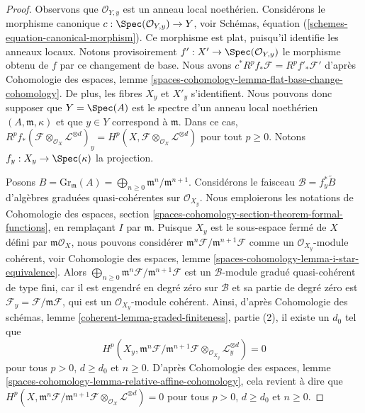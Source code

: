 \begin{proof}
Observons que $\mathcal{O}_{Y, y}$ est un anneau local noethérien.
Considérons le morphisme canonique
$c : \Spec(\mathcal{O}_{Y, y}) \to Y$, voir
Schémas, équation (\ref{schemes-equation-canonical-morphism}).
Ce morphisme est plat, puisqu'il identifie les anneaux locaux.
Notons provisoirement $f' : X' \to \Spec(\mathcal{O}_{Y, y})$
le morphisme obtenu de $f$ par ce changement de base. Nous avons
$c^*R^pf_*\mathcal{F} = R^pf'_*\mathcal{F}'$ d'après
Cohomologie des espaces, lemme
\ref{spaces-cohomology-lemma-flat-base-change-cohomology}.
De plus, les fibres $X_y$ et $X'_y$ s'identifient.
Nous pouvons donc supposer que $Y = \Spec(A)$ est le spectre d'un
anneau local noethérien $(A, \mathfrak m, \kappa)$ et que $y \in Y$
correspond à $\mathfrak m$. Dans ce cas,
$R^pf_*(\mathcal{F} \otimes_{\mathcal{O}_X} \mathcal{L}^{\otimes d})_y =
H^p(X, \mathcal{F} \otimes_{\mathcal{O}_X} \mathcal{L}^{\otimes d})$
pour tout $p \geq 0$. Notons $f_y : X_y \to \Spec(\kappa)$ la projection.

\medskip\noindent
Posons $B = \text{Gr}_\mathfrak m(A) =
\bigoplus_{n \geq 0} \mathfrak m^n/\mathfrak m^{n + 1}$.
Considérons le faisceau $\mathcal{B} = f_y^*\widetilde{B}$
d'algèbres graduées quasi-cohérentes sur $\mathcal{O}_{X_y}$.
Nous emploierons les notations de Cohomologie des espaces, section
\ref{spaces-cohomology-section-theorem-formal-functions},
en remplaçant $I$ par $\mathfrak m$.
Puisque $X_y$ est le sous-espace fermé de $X$ défini par
$\mathfrak m\mathcal{O}_X$, nous pouvons considérer
$\mathfrak m^n\mathcal{F}/\mathfrak m^{n + 1}\mathcal{F}$
comme un $\mathcal{O}_{X_y}$-module cohérent, voir
Cohomologie des espaces, lemme \ref{spaces-cohomology-lemma-i-star-equivalence}.
Alors
$\bigoplus_{n \geq 0} \mathfrak m^n\mathcal{F}/\mathfrak m^{n + 1}\mathcal{F}$
est un $\mathcal{B}$-module gradué quasi-cohérent de type fini,
car il est engendré en degré zéro sur $\mathcal{B}$
et sa partie de degré zéro est
$\mathcal{F}_y = \mathcal{F}/\mathfrak m \mathcal{F}$,
qui est un $\mathcal{O}_{X_y}$-module cohérent.
Ainsi, d'après Cohomologie des schémas, lemme
\ref{coherent-lemma-graded-finiteness}, partie (2),
il existe un $d_0$ tel que
$$
H^p(X_y, \mathfrak m^n \mathcal{F}/ \mathfrak m^{n + 1}\mathcal{F}
\otimes_{\mathcal{O}_{X_y}} \mathcal{L}_y^{\otimes d}) = 0
$$
pour tous $p > 0$, $d \geq d_0$ et $n \geq 0$. D'après
Cohomologie des espaces, lemme
\ref{spaces-cohomology-lemma-relative-affine-cohomology},
cela revient à dire que
$
H^p(X, \mathfrak m^n \mathcal{F}/ \mathfrak m^{n + 1}\mathcal{F}
\otimes_{\mathcal{O}_X} \mathcal{L}^{\otimes d}) = 0
$
pour tous $p > 0$, $d \geq d_0$ et $n \geq 0$.


\end{proof}
